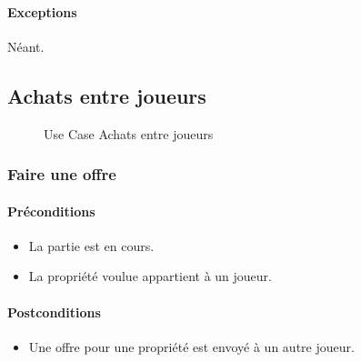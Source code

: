 \documentclass[a4paper,11pt]{report}
\begin{document}
\paragraph{Exceptions} Néant.



\newpage
\subsection{Achats entre joueurs}
\begin{figure}[ht]
    \caption{Use Case Achats entre joueurs}
\end{figure}
\subsubsection{Faire une offre}
\paragraph{Préconditions}
\begin{itemize}
 \item La partie est en cours.
 \item La propriété voulue appartient à un joueur.
\end{itemize}
\paragraph{Postconditions}
\begin{itemize}
 \item Une offre pour une propriété est envoyé à un autre joueur.
\end{itemize}
\end{document}
